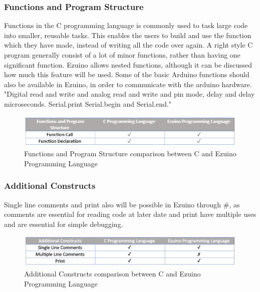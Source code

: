 \subsubsection*{Functions and Program Structure}
Functions in the C programming language is commonly used to task large code into smaller, reusable tasks. This enables the users to build and use the function which they have made, instead of writing all the code over again. A right style C program generally consist of a lot of minor functions, rather than having one significant function. 
Ezuino allows nested functions, although it can be discussed how much this feature will be used.
Some of the basic Arduino functions should also be available in Ezuino, in order to communicate with the arduino hardware.  "Digital read and write and analog read and write and pin mode, delay and delay microseconds. Serial.print Serial.begin and Serial.end."
\begin{figure}[H]
\centering
\includegraphics[scale=0.80]{figures/language_features/langf10.png}
\caption{Functions and Program Structure comparison between C and Ezuino Programming Language}
\label{lf10}
\end{figure}
\subsubsection*{Additional Constructs}
Single line comments and print also will be possible in Ezuino through #, as comments are essential for reading code at later date and print have multiple uses and are essential for simple debugging.
\begin{figure}[H]
\centering
\includegraphics[scale=0.60]{figures/language_features/langf09.png}
\caption{Additional Constructs comparison between C and Ezuino Programming Language}
\label{lf09}
\end{figure}

